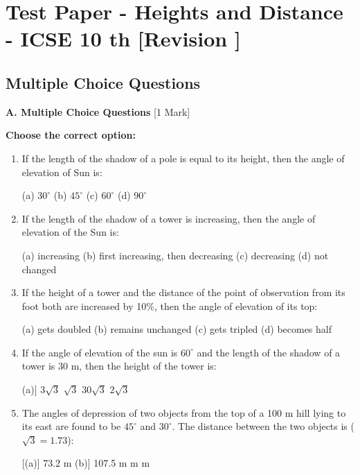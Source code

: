 \documentclass{article}
\begin{document}
	\section*{Test Paper - Heights and Distance - ICSE 10 th [Revision ]}
	\subsection*{Multiple Choice Questions}

	\textbf{A. Multiple Choice Questions} \hfill [1 Mark]
	
	\textbf{Choose the correct option:}
	
	\begin{enumerate}
		\item If the length of the shadow of a pole is equal to its height, then the angle of elevation of Sun is:
	
		(a) $30^\circ$ \quad (b) $45^\circ$ \quad (c) $60^\circ$ \quad (d) $90^\circ$
	
		\item If the length of the shadow of a tower is increasing, then the angle of elevation of the Sun is:

(a) increasing \quad (b) first increasing, then decreasing \quad (c) decreasing \quad (d) not changed



		\item If the height of a tower and the distance of the point of observation from its foot both are increased by 10\%, then the angle of elevation of its top:

	(a) gets doubled \quad (b) remains unchanged \quad (c) gets tripled \quad (d) becomes half
	
	
	
	
		\item If the angle of elevation of the sun is $60^\circ$ and the length of the shadow of a tower is 30 m, then the height of the tower is:
	
			(a)] $3\sqrt{3}$ \quad
		[(b)] $\sqrt{3}$ \quad
	[(c)] $30\sqrt{3}$ \quad
		[(d)] $2\sqrt{3}$ \quad
	
		\item The angles of depression of two objects from the top of a 100 m hill lying to its east are found to be $45^\circ$ and $30^\circ$. The distance between the two objects is ($\sqrt{3} = 1.73$):

		[(a)] 73.2 m \quad
		(b)] 107.5 m  m  m \quad
	
	


\end{enumerate}
\end{document}
